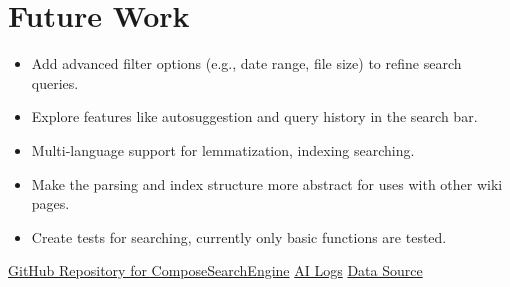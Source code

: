 \documentclass[conference]{IEEEtran}
\begin{document}
    \section{Future Work}{
    \begin{itemize}
        \item Add advanced filter options (e.g., date range, file size) to refine search queries.
        \item Explore features like autosuggestion and query history in the search bar.
        \item Multi-language support for lemmatization, indexing searching.
        \item Make the parsing and index structure more abstract for uses with other wiki pages.
        \item Create tests for searching, currently only basic functions are tested.
    \end{itemize}
    }

    \begin{thebibliography}{00}
         \href{https://github.com/kastik/ComposeSearchEngine}{GitHub Repository for ComposeSearchEngine}
         \href{https://github.com/kastik/ComposeSearchEngine/blob/master/searchenginedocs/src/ai.log}{AI Logs}
         \href{https://archlinux.org/packages/extra/any/arch-wiki-docs/}{Data Source}
    \end{thebibliography}
    \vspace{12pt}
\end{document}
